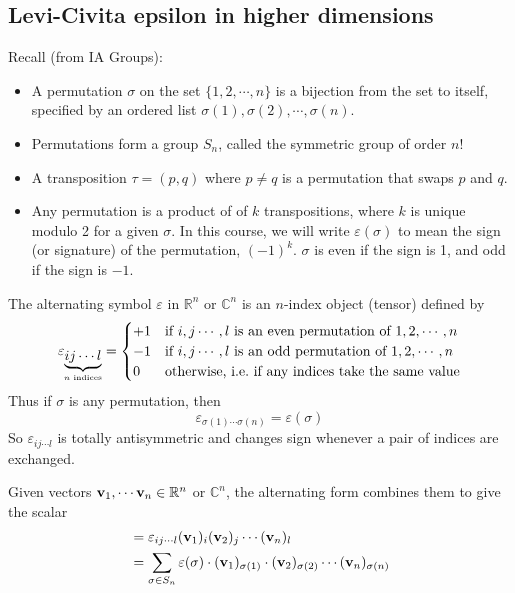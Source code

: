 \subsection{Levi-Civita epsilon in higher dimensions}
Recall (from IA Groups):
\begin{itemize}
	\item A permutation \(\sigma\) on the set \(\{ 1, 2, \cdots, n \}\) is a bijection from the set to itself, specified by an ordered list \(\sigma(1), \sigma(2), \cdots, \sigma(n)\).
	\item Permutations form a group \(S_n\), called the symmetric group of order \(n!
	      \)
	\item A transposition \(\tau = (p, q)\) where \(p \neq q\) is a permutation that swaps \(p\) and \(q\).
	\item Any permutation is a product of of \(k\) transpositions, where \(k\) is unique modulo 2 for a given \(\sigma\).
	      In this course, we will write \(\varepsilon(\sigma)\) to mean the sign (or signature) of the permutation, \((-1)^k\).
	      \(\sigma\) is even if the sign is 1, and odd if the sign is \(-1\).
\end{itemize}
The alternating symbol \(\varepsilon\) in \(\mathbb R^n\) or \(\mathbb C^n\) is an \(n\)-index object (tensor) defined by
\[
	\varepsilon_{\underbrace{ij\cdots l}_{\mathclap{n \text{ indices}}}} = \begin{cases}
		+1 & \text{if } i, j \cdots, l \text{ is an even permutation of } 1, 2, \cdots, n \\
		-1 & \text{if } i, j \cdots, l \text{ is an odd permutation of } 1, 2, \cdots, n  \\
		0  & \text{otherwise, i.e.\ if any indices take the same value}
	\end{cases}
\]
Thus if \(\sigma\) is any permutation, then
\[
	\varepsilon_{\sigma(1)\cdots\sigma(n)} = \varepsilon(\sigma)
\]
So \(\varepsilon_{ij\cdots l}\) is totally antisymmetric and changes sign whenever a pair of indices are exchanged.
\begin{definition}
	Given vectors \(\vb v_1, \cdots \vb v_n \in \mathbb R^n\) or \(\mathbb C^n\), the alternating form combines them to give the scalar
	\begin{align*}
		[\vb v_1, \vb v_2, \cdots, \vb v_n ] & = \varepsilon_{ij\cdots l} (\vb v_1)_i (\vb v_2)_j \cdots (\vb v_n)_l                                                            \\
		                                     & = \sum_{\sigma \in S_n} \varepsilon(\sigma) \cdot (\vb v_1)_{\sigma(1)} \cdot (\vb v_2)_{\sigma(2)} \cdots (\vb v_n)_{\sigma(n)}
	\end{align*}
\end{definition}

